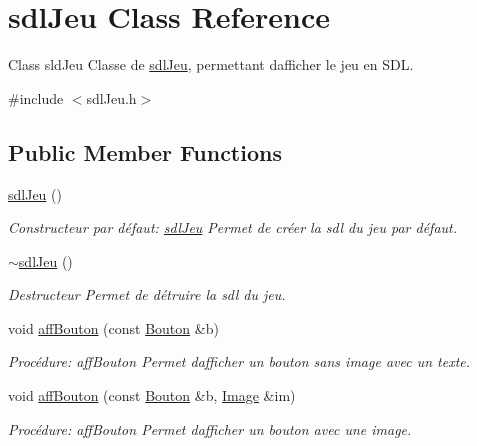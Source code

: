 \hypertarget{classsdlJeu}{}\section{sdl\+Jeu Class Reference}
\label{classsdlJeu}


Class sld\+Jeu Classe de \hyperlink{classsdlJeu}{sdl\+Jeu}, permettant d\textquotesingle{}afficher le jeu en S\+DL.  




{\ttfamily \#include $<$sdl\+Jeu.\+h$>$}

\subsection*{Public Member Functions}
\begin{DoxyCompactItemize}
\item 
\hyperlink{classsdlJeu_a06ba2075a4b592f6d0a2e268c29a044e}{sdl\+Jeu} ()
\begin{DoxyCompactList}\small\item\em Constructeur par défaut\+: \hyperlink{classsdlJeu}{sdl\+Jeu} Permet de créer la sdl du jeu par défaut. \end{DoxyCompactList}\item 
\mbox{\label{classsdlJeu_a5bcd8f5ed17a2cea2ad2fc633415cbcc}} 
\hyperlink{classsdlJeu_a5bcd8f5ed17a2cea2ad2fc633415cbcc}{$\sim$sdl\+Jeu} ()
\begin{DoxyCompactList}\small\item\em Destructeur Permet de détruire la sdl du jeu. \end{DoxyCompactList}\item 
void \hyperlink{classsdlJeu_a5ada7438cc0d3226ad2aa535a523a895}{aff\+Bouton} (const \hyperlink{classBouton}{Bouton} \&b)
\begin{DoxyCompactList}\small\item\em Procédure\+: aff\+Bouton Permet d\textquotesingle{}afficher un bouton sans image avec un texte. \end{DoxyCompactList}\item 
void \hyperlink{classsdlJeu_a71bd3bdde9cf7a273b2ec05b08fdc361}{aff\+Bouton} (const \hyperlink{classBouton}{Bouton} \&b, \hyperlink{classImage}{Image} \&im)
\begin{DoxyCompactList}\small\item\em Procédure\+: aff\+Bouton Permet d\textquotesingle{}afficher un bouton avec une image. \end{DoxyCompactList}\item 

\end{DoxyCompactItemize}
